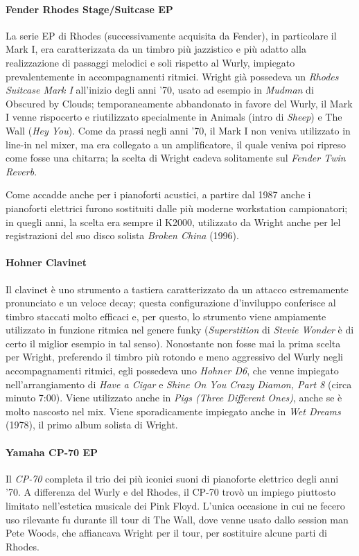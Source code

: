 \documentclass[class=book, crop=false, oneside, 12pt]{standalone}
\begin{document}
    \paragraph{Fender Rhodes Stage/Suitcase EP}
    La serie EP di Rhodes (successivamente acquisita da Fender), in particolare il Mark I, era caratterizzata da un timbro più jazzistico e più adatto alla realizzazione di passaggi melodici e soli rispetto al Wurly, impiegato prevalentemente in accompagnamenti ritmici. Wright già possedeva un \emph{Rhodes Suitcase Mark I} all'inizio degli anni '70, usato ad esempio in \emph{Mudman} di Obscured by Clouds; temporaneamente abbandonato in favore del Wurly, il Mark I venne rispocerto e riutilizzato specialmente in Animals (intro di \emph{Sheep}) e The Wall (\emph{Hey You}). Come da prassi negli anni '70, il Mark I non veniva utilizzato in line-in nel mixer, ma era collegato a un amplificatore, il quale veniva poi ripreso come fosse una chitarra; la scelta di Wright cadeva solitamente sul \emph{Fender Twin Reverb}.

    Come accadde anche per i pianoforti acustici, a partire dal 1987 anche i pianoforti elettrici furono sostituiti dalle più moderne workstation campionatori; in quegli anni, la scelta era sempre il K2000, utilizzato da Wright anche per lel registrazioni del suo disco solista \emph{Broken China} (1996).

    \paragraph{Hohner Clavinet}
    Il clavinet è uno strumento a tastiera caratterizzato da un attacco estremamente pronunciato e un veloce decay; questa configurazione d'inviluppo conferisce al timbro staccati molto efficaci e, per questo, lo strumento viene ampiamente utilizzato in funzione ritmica nel genere funky (\emph{Superstition} di \emph{Stevie Wonder} è di certo il miglior esempio in tal senso). Nonostante non fosse mai la prima scelta per Wright, preferendo il timbro più rotondo e meno aggressivo del Wurly negli accompagnamenti ritmici, egli possedeva uno \emph{Hohner D6}, che venne impiegato nell'arrangiamento di \emph{Have a Cigar} e \emph{Shine On You Crazy Diamon, Part 8} (circa minuto 7:00). Viene utilizzato anche in \emph{Pigs (Three Different Ones)}, anche se è molto nascosto nel mix. Viene sporadicamente impiegato anche in \emph{Wet Dreams} (1978), il primo album solista di Wright.

    \paragraph{Yamaha CP-70 EP}
    Il \emph{CP-70} completa il trio dei più iconici suoni di pianoforte elettrico degli anni '70. A differenza del Wurly e del Rhodes, il CP-70 trovò un impiego piuttosto limitato nell'estetica musicale dei Pink Floyd. L'unica occasione in cui ne fecero uso rilevante fu durante ill tour di The Wall, dove venne usato dallo session man Pete Woods, che affiancava Wright per il tour, per sostituire alcune parti di Rhodes.
\end{document}
